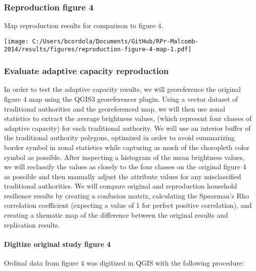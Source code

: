 \documentclass[
]{article}
\begin{document}
\hypertarget{reproduction-figure-4}{%
\subsubsection{Reproduction figure 4}\label{reproduction-figure-4}}

Map reproduction results for comparison to figure 4.

\texttt{[image: C:/Users/bcordola/Documents/GitHub/RPr-Malcomb-2014/results/figures/reproduction-figure-4-map-1.pdf]}

\hypertarget{evaluate-adaptive-capacity-reproduction}{%
\subsubsection{Evaluate adaptive capacity
reproduction}\label{evaluate-adaptive-capacity-reproduction}}

In order to test the adaptive capacity results, we will georeference the
original figure 4 map using the QGIS3 georeferencer plugin. Using a
vector dataset of traditional authorities and the georeferenced map, we
will then use zonal statistics to extract the average brightness values,
(which represent four classes of adaptive capacity) for each traditional
authority. We will use an interior buffer of the traditional authority
polygons, optimized in order to avoid summarizing border symbol in zonal
statistics while capturing as much of the choropleth color symbol as
possible. After inspecting a histogram of the mean brightness values, we
will reclassify the values as closely to the four classes on the
original figure 4 as possible and then manually adjust the attribute
values for any misclassified traditional authorities. We will compare
original and reproduction household resilience results by creating a
confusion matrix, calculating the Spearman's Rho correlation coefficient
(expecting a value of 1 for perfect positive correlation), and creating
a thematic map of the difference between the original results and
replication results.

\hypertarget{digitize-original-study-figure-4}{%
\paragraph{Digitize original study figure
4}\label{digitize-original-study-figure-4}}

Ordinal data from figure 4 was digitized in QGIS with the following
procedure:
\end{document}
